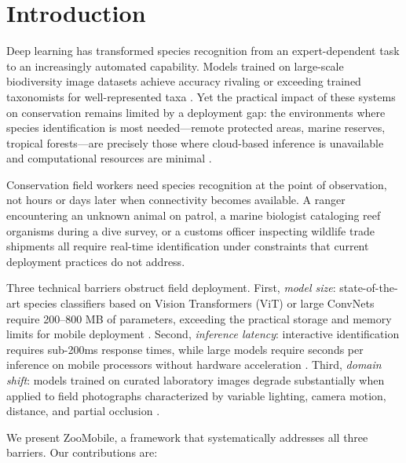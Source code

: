 \documentclass[11pt,a4paper]{article}
\begin{document}
\section{Introduction}
\label{sec:introduction}

Deep learning has transformed species recognition from an expert-dependent task to an increasingly automated capability.
Models trained on large-scale biodiversity image datasets achieve accuracy rivaling or exceeding trained taxonomists for well-represented taxa \citep{vanhorn2021benchmarking}.
Yet the practical impact of these systems on conservation remains limited by a deployment gap: the environments where species identification is most needed---remote protected areas, marine reserves, tropical forests---are precisely those where cloud-based inference is unavailable and computational resources are minimal \citep{tuia2022perspectives}.

Conservation field workers need species recognition at the point of observation, not hours or days later when connectivity becomes available.
A ranger encountering an unknown animal on patrol, a marine biologist cataloging reef organisms during a dive survey, or a customs officer inspecting wildlife trade shipments all require real-time identification under constraints that current deployment practices do not address.

Three technical barriers obstruct field deployment.
First, \emph{model size}: state-of-the-art species classifiers based on Vision Transformers (ViT) or large ConvNets require 200--800 MB of parameters, exceeding the practical storage and memory limits for mobile deployment \citep{dosovitskiy2021image}.
Second, \emph{inference latency}: interactive identification requires sub-200ms response times, while large models require seconds per inference on mobile processors without hardware acceleration \citep{howard2019searching}.
Third, \emph{domain shift}: models trained on curated laboratory images degrade substantially when applied to field photographs characterized by variable lighting, camera motion, distance, and partial occlusion \citep{beery2018recognition}.

We present ZooMobile, a framework that systematically addresses all three barriers.
Our contributions are:
\end{document}
